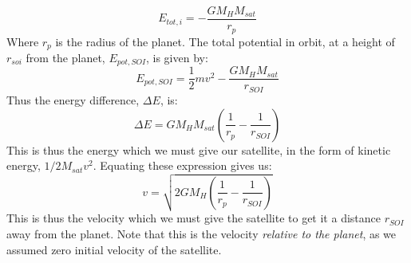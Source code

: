 \documentclass[a4paper,10pt,english]{article}
\begin{document}
$$E_{tot, i}=-\frac{GM_HM_{sat}}{r_p}$$
Where $r_p$ is the radius of the planet. The total potential in orbit, at a height of $r_{soi}$ from the planet, $E_{pot,SOI}$, is given by:
$$E_{pot, SOI}=\frac{1}{2}mv^2-\frac{GM_HM_{sat}}{r_{SOI}}$$
Thus the energy difference, $\Delta E$, is:
$$\Delta E = GM_HM_{sat}\left(\frac{1}{r_p}-\frac{1}{r_{SOI}}\right)$$
This is thus the energy which we must give our satellite, in the form of kinetic energy, $1/2M_{sat}v^2$. Equating these expression gives us:
\begin{equation}\label{eq:Delta_v_SOI}
v=\sqrt{2GM_H\left(\frac{1}{r_p}-\frac{1}{r_{SOI}}\right)}
\end{equation}
This is thus the velocity which we must give the satellite to get it a distance $r_{SOI}$ away from the planet. Note that this is the velocity \textit{relative to the planet}, as we assumed zero initial velocity of the satellite.
\end{document}

